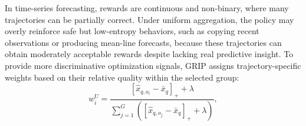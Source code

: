 In time-series forecasting, rewards are continuous and non-binary, where many trajectories can be partially correct. Under uniform aggregation, the policy may overly reinforce safe but low-entropy behaviors, such as copying recent observations or producing mean-line forecasts, because these trajectories can obtain moderately acceptable rewards despite lacking real predictive insight. To provide more discriminative optimization signals, GRIP assigns trajectory-specific weights based on their relative quality within the selected group:
{\setlength{\abovedisplayskip}{2pt}
\setlength{\belowdisplayskip}{2pt}
\begin{equation}
w_i^U =
\frac{[\hat{x}_{q,o_i}-\bar{x}_q]_+ + \lambda}
{\sum_{j=1}^{G}\left([\hat{x}_{q,o_j}-\bar{x}_q]_+ + \lambda\right)},
\end{equation}}

